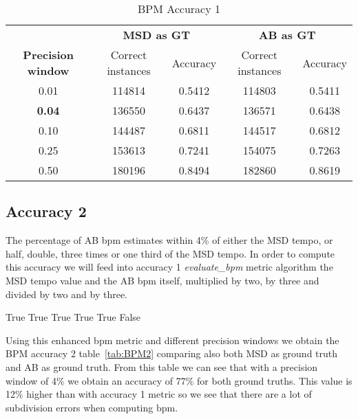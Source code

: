 \documentclass[a4paper]{article}
\begin{document}
\begin{table}[ht!]
\centering
\begin{tabular}{ccccc}

 & \multicolumn{2}{c}{\textbf{MSD as GT}} & \multicolumn{2}{c}{\textbf{AB as GT}}  \\ \cline{2-5}
\textbf{Precision window}& Correct instances & Accuracy & Correct instances & Accuracy \\ \hline
0.01& 114814 & 0.5412 & 114803 & 0.5411 \\ 
\textbf{0.04}& 136550 & 0.6437 & 136571 & 0.6438 \\ 
0.10& 144487 & 0.6811 & 144517 & 0.6812 \\ 
0.25& 153613 & 0.7241 & 154075 & 0.7263 \\ 
0.50& 180196 & 0.8494 & 182860 & 0.8619 \\ \hline
\end{tabular}
\caption{BPM Accuracy 1}
\label{tab:bpm1}
\end{table}

\subsection{Accuracy 2} 
The percentage of AB bpm estimates within 4\% of either the MSD tempo, or half, double, three times or one third of the MSD tempo. In order to compute this accuracy we will feed into accuracy 1 \textit{evaluate\_bpm} metric algorithm the MSD tempo value and the AB bpm itself, multiplied by two, by three and divided by two and by three. 

\begin{algorithmic}
    \Return True
    \Return True
    \Return True
    \Return True
    \Return True
\Else
	\Return False
\EndIf
\EndFunction
\end{algorithmic}

Using this enhanced bpm metric and different precision windows we obtain the BPM accuracy 2 table~\ref{tab:BPM2} comparing also both MSD as ground truth and AB as ground truth. From this table we can see that with a precision window of 4\% we obtain an accuracy of 77\% for both ground truths. This value is 12\% higher than with accuracy 1 metric so we see that there are a lot of subdivision errors when computing bpm.
\end{document}

